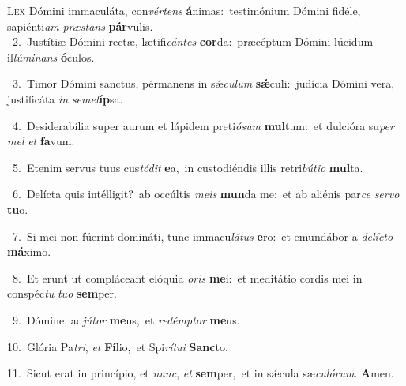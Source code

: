 \lettrine{\initial\textcolor{\initialcolor}{L}}{ex} Dómini immaculáta, con\-\textit{vér}\-\textit{tens} \textbf{á}\-nimas:~\star testimónium Dómini fidéle, sapiénti\textit{am} \textit{præ}\-\textit{stans} \textbf{pár}\-vulis.\\
{\numbfont\textcolor{\numbcolor}{~2.}}~Justítiæ Dómini rectæ, lætifi\-\textit{cán}\-\textit{tes} \textbf{cor}\-da:~\star præcéptum Dómini lúcidum il\-\textit{lú}\-\textit{mi}\textit{nans} \textbf{ó}\-culos.\par
{\numbfont\textcolor{\numbcolor}{~3.}}~Timor Dómini sanctus, pérmanens in sǽ\-\textit{cu}\-\textit{lum} \textbf{sǽ}\-culi:~\star judícia Dómini vera, justificáta \textit{in} \textit{se}\-\textit{met}\textbf{íp}sa.\par
{\numbfont\textcolor{\numbcolor}{~4.}}~Desiderabília super aurum et lápidem preti\-\textit{ó}\-\textit{sum} \textbf{mul}\-tum:~\star et dulcióra su\textit{per} \textit{mel} \textit{et} \textbf{fa}\-vum.\par
{\numbfont\textcolor{\numbcolor}{~5.}}~Etenim servus tuus cus\-\textit{tó}\-\textit{dit} \textbf{e}\-a,~\star in custodiéndis illis retri\-\textit{bú}\-\textit{ti}\textit{o} \textbf{mul}\-ta.\par
{\numbfont\textcolor{\numbcolor}{~6.}}~Delícta quis intélligit?~\dagger ab occúltis \textit{me}\-\textit{is} \textbf{mun}\-da me:~\star et ab aliénis par\textit{ce} \textit{ser}\-\textit{vo} \textbf{tu}\-o.\par
{\numbfont\textcolor{\numbcolor}{~7.}}~Si mei non fúerint domináti, tunc immacu\-\textit{lá}\-\textit{tus} \textbf{e}\-ro:~\star et emundábor a \textit{de}\-\textit{líc}\textit{to} \textbf{má}\-ximo.\par
{\numbfont\textcolor{\numbcolor}{~8.}}~Et erunt ut compláceant elóquia \textit{o}\-\textit{ris} \textbf{me}\-i:~\star et meditátio cordis mei in conspéc\textit{tu} \textit{tu}\-\textit{o} \textbf{sem}\-per.\par
{\numbfont\textcolor{\numbcolor}{~9.}}~Dómine, ad\-\textit{jú}\-\textit{tor} \textbf{me}\-us,~\star et \textit{red}\-\textit{émp}\textit{tor} \textbf{me}\-us.\par
{\numbfont\textcolor{\numbcolor}{10.}}~Glória Pa\-\textit{tri}\-, \textit{et} \textbf{Fí}\-lio,~\star et Spi\-\textit{rí}\-\textit{tu}\textit{i} \textbf{Sanc}\-to.\par
{\numbfont\textcolor{\numbcolor}{11.}}~Sicut erat in princípio, et \textit{nunc}\-, \textit{et} \textbf{sem}\-per,~\star et in sǽcula sæ\-\textit{cu}\-\textit{ló}\textit{rum}. \textbf{A}\-men.\par
